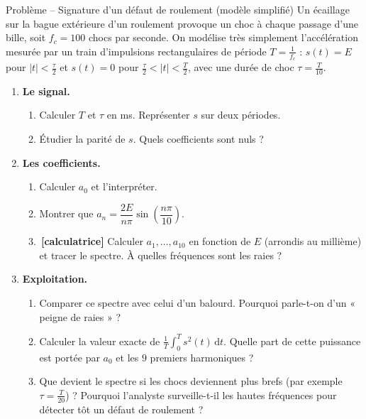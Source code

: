 \documentclass[a4paper,11pt]{article}
\newcommand{\calc}{\,{\color{uimmred}\small\textbf{[calculatrice]}}}
\begin{document}
\begin{exo}{Problème -- Signature d'un défaut de roulement (modèle simplifié)}
\label{exo:pb}
Un écaillage sur la bague extérieure d'un roulement provoque un choc à chaque passage d'une bille, soit $f_c = 100$ chocs par seconde. On modélise très simplement l'accélération mesurée par un train d'impulsions rectangulaires de période $T = \frac{1}{f_c}$ : $s(t) = E$ pour $|t| < \frac\tau2$ et $s(t) = 0$ pour $\frac\tau2 < |t| < \frac T2$, avec une durée de choc $\tau = \frac{T}{10}$.
\begin{enumerate}
  \item \textbf{Le signal.}
  \begin{enumerate}
    \item Calculer $T$ et $\tau$ en ms. Représenter $s$ sur deux périodes.
    \item Étudier la parité de $s$. Quels coefficients sont nuls ?
  \end{enumerate}
  \item \textbf{Les coefficients.}
  \begin{enumerate}
    \item Calculer $a_0$ et l'interpréter.
    \item Montrer que $a_n = \dfrac{2E}{n\pi}\sin\left(\dfrac{n\pi}{10}\right)$.
    \item \calc{} Calculer $a_1, \dots, a_{10}$ en fonction de $E$ (arrondis au millième) et tracer le spectre. À quelles fréquences sont les raies ?
  \end{enumerate}
  \item \textbf{Exploitation.}
  \begin{enumerate}
    \item Comparer ce spectre avec celui d'un balourd. Pourquoi parle-t-on d'un « peigne de raies » ?
    \item Calculer la valeur exacte de $\frac1T\int_0^T s^2(t)\,\mathrm dt$. Quelle part de cette puissance est portée par $a_0$ et les $9$ premiers harmoniques ?
    \item Que devient le spectre si les chocs deviennent plus brefs (par exemple $\tau = \frac{T}{20}$) ? Pourquoi l'analyste surveille-t-il les hautes fréquences pour détecter tôt un défaut de roulement ?
  \end{enumerate}
\end{enumerate}
\end{exo}
\end{document}
